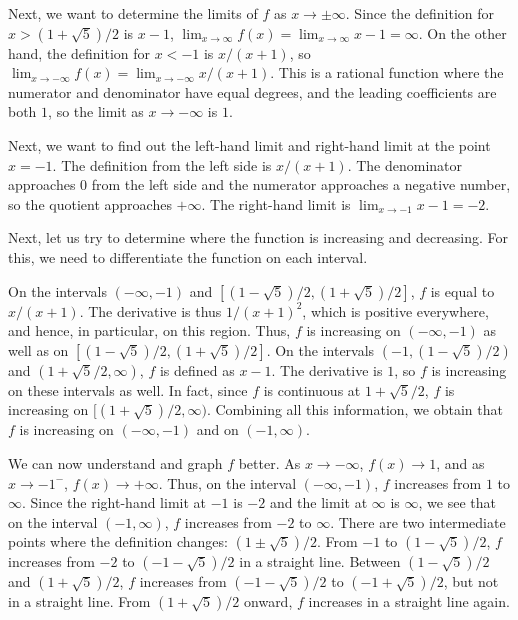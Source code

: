 \documentclass[10pt]{amsart}
\begin{document}
Next, we want to determine the limits of $f$ as $x \to \pm
\infty$. Since the definition for $x > (1 + \sqrt{5})/2$ is $x - 1$,
$\lim_{x \to \infty}f(x) = \lim_{x \to \infty} x - 1 = \infty$. On the
other hand, the definition for $x < -1$ is $x/(x+1)$, so $\lim_{x \to
-\infty} f(x) = \lim_{x \to -\infty} x/(x+1)$. This is a rational
function where the numerator and denominator have equal degrees, and
the leading coefficients are both $1$, so the limit as $x \to -\infty$
is $1$.

Next, we want to find out the left-hand limit and right-hand limit at
the point $x = -1$. The definition from the left side is
$x/(x+1)$. The denominator approaches $0$ from the left side and the
numerator approaches a negative number, so the quotient approaches
$+\infty$. The right-hand limit is $\lim_{x \to -1} x - 1 = -2$.

Next, let us try to determine where the function is increasing and
decreasing. For this, we need to differentiate the function on each
interval.  

On the intervals $(-\infty,-1)$ and $[(1 - \sqrt{5})/2,(1 +
\sqrt{5})/2]$, $f$ is equal to $x/(x + 1)$. The derivative is thus
$1/(x + 1)^2$, which is positive everywhere, and hence, in particular,
on this region. Thus, $f$ is increasing on $(-\infty,-1)$ as well as
on $[(1 - \sqrt{5})/2,(1 + \sqrt{5})/2]$. On the intervals $(-1,(1 -
\sqrt{5})/2)$ and $(1 + \sqrt{5}/2,\infty)$, $f$ is defined as $x -
1$. The derivative is $1$, so $f$ is increasing on these intervals as
well. In fact, since $f$ is continuous at $1 + \sqrt{5}/2$, $f$ is
increasing on $[(1 + \sqrt{5})/2,\infty)$. Combining all this
information, we obtain that $f$ is increasing on $(-\infty,-1)$ and on
$(-1,\infty)$.

We can now understand and graph $f$ better. As $x \to -\infty$, $f(x)
\to 1$, and as $x \to -1^-$, $f(x) \to +\infty$. Thus, on the interval
$(-\infty,-1)$, $f$ increases from $1$ to $\infty$. Since the
right-hand limit at $-1$ is $-2$ and the limit at $\infty$ is $\infty$,
we see that on the interval $(-1,\infty)$, $f$ increases from $-2$ to
$\infty$. There are two intermediate points where the definition
changes: $(1 \pm \sqrt{5})/2$. From $-1$ to $(1 - \sqrt{5})/2$, $f$
increases from $-2$ to $(-1 - \sqrt{5})/2$ in a straight line. Between
$(1 - \sqrt{5})/2$ and $(1 + \sqrt{5})/2$, $f$ increases from $(-1 -
\sqrt{5})/2$ to $(-1 + \sqrt{5})/2$, but not in a straight line. From
$(1 + \sqrt{5})/2$ onward, $f$ increases in a straight line again.
\end{document}
